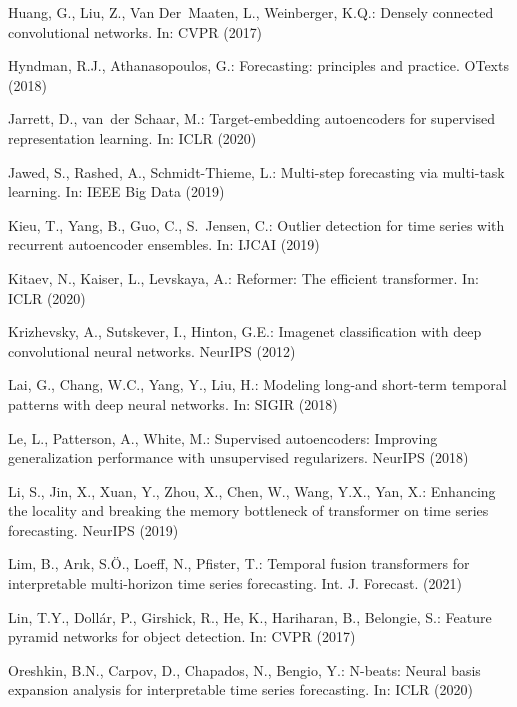 \documentclass[runningheads]{llncs}
\begin{document}
\begin{thebibliography}{10}
    Huang, G., Liu, Z., Van Der~Maaten, L., Weinberger, K.Q.: Densely connected
      convolutional networks. In: CVPR (2017)
    
    Hyndman, R.J., Athanasopoulos, G.: Forecasting: principles and practice. OTexts
      (2018)
    
    Jarrett, D., van~der Schaar, M.: Target-embedding autoencoders for supervised
      representation learning. In: ICLR (2020)
    
    Jawed, S., Rashed, A., Schmidt-Thieme, L.: Multi-step forecasting via
      multi-task learning. In: IEEE Big Data (2019)
    
    Kieu, T., Yang, B., Guo, C., S.~Jensen, C.: Outlier detection for time series
      with recurrent autoencoder ensembles. In: IJCAI (2019)
    
    Kitaev, N., Kaiser, L., Levskaya, A.: Reformer: The efficient transformer. In:
      ICLR (2020)
    
    Krizhevsky, A., Sutskever, I., Hinton, G.E.: Imagenet classification with deep
      convolutional neural networks. NeurIPS  (2012)
    
    Lai, G., Chang, W.C., Yang, Y., Liu, H.: Modeling long-and short-term temporal
      patterns with deep neural networks. In: SIGIR (2018)
    
    Le, L., Patterson, A., White, M.: Supervised autoencoders: Improving
      generalization performance with unsupervised regularizers. NeurIPS  (2018)
    
    Li, S., Jin, X., Xuan, Y., Zhou, X., Chen, W., Wang, Y.X., Yan, X.: Enhancing
      the locality and breaking the memory bottleneck of transformer on time series
      forecasting. NeurIPS  (2019)
    
    Lim, B., Arık, S.{\"O}., Loeff, N., Pfister, T.: Temporal fusion transformers
      for interpretable multi-horizon time series forecasting. Int. J. Forecast.
      (2021)
    
    Lin, T.Y., Doll{\'a}r, P., Girshick, R., He, K., Hariharan, B., Belongie, S.:
      Feature pyramid networks for object detection. In: CVPR (2017)
    
    Oreshkin, B.N., Carpov, D., Chapados, N., Bengio, Y.: N-beats: Neural basis
      expansion analysis for interpretable time series forecasting. In: ICLR (2020)
    

\end{thebibliography}
\end{document}
